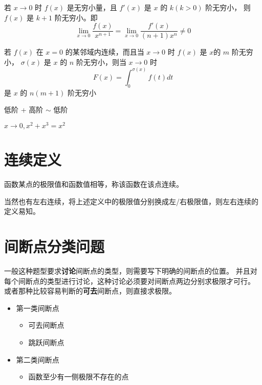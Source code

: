\begin{lemma}[L'Hospital求导定阶]
	若 $x \to 0$ 时 $f(x)$ 是无穷小量，且 $f'(x)$ 是 $x$ 的 $k(k>0)$ 阶无穷小，
	则 $f(x)$ 是 $k+1$ 阶无穷小。即
	\begin{equation}
		\lim_{x \to 0} \dfrac{f(x)}{x^{n+1}} = \lim_{x \to 0} \dfrac{f'(x)}{(n+1)x^{n}} \neq 0
	\end{equation}
\end{lemma}

\begin{lemma}
	若 $f(x)$ 在 $x=0$ 的某邻域内连续，而且当 $x\to0$ 时 $f(x)$ 是 $x$的 $m$ 阶无穷小，
	$\sigma(x)$ 是 $x$ 的 $n$ 阶无穷小，则当 $x\to0$ 时
	\begin{equation*}
		F(x) = \int_{0}^{\sigma(x)} f(t) dt
	\end{equation*}
	是 $x$ 的 $n(m+1)$ 阶无穷小
\end{lemma}

\begin{lemma}
	低阶 + 高阶 $\sim$ 低阶
	
	$x \to 0, x^2+x^3=x^2$
\end{lemma}

\section{连续定义}

\begin{definition}
	函数某点的极限值和函数值相等，称该函数在该点连续。
\end{definition}
当然也有左右连续，将上述定义中的极限值分别换成左/右极限值，则左右连续的定义易知。

\section{间断点分类问题}
一般这种题型要求\textbf{讨论}间断点的类型，则需要写下明确的间断点的位置。
并且对每个间断点的类型进行讨论，这种讨论必须要对间断点两边分别求极限才可行。
或者那种比较容易判断的\textbf{可去}间断点，则直接求极限。

\begin{itemize}
    \item 第一类间断点
        \begin{itemize} 
            \item 可去间断点
            \item 跳跃间断点
        \end{itemize}
    \item 第二类间断点
        \begin{itemize}
            \item 函数至少有一侧极限不存在的点
        \end{itemize}
\end{itemize}
